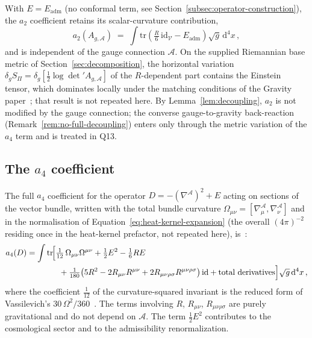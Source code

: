 \documentclass[12pt,a4paper]{article}
\theoremstyle{remark}
\theoremstyle{plain}
\theoremstyle{definition}
\begin{document}
      With $E = E_{\mathrm{adm}}$ (no conformal term, see
      Section~\ref{subsec:operator-construction}), the $a_2$
      coefficient retains its scalar-curvature contribution,
      \begin{equation}\label{eq:a2-minimal}
        a_2(A_{g,\mathcal{A}})
        \;=\;
        \int \mathrm{tr}\!\left(
          \tfrac{R}{6}\,\mathrm{id}_\mathcal{V}
          - E_{\mathrm{adm}}
        \right)\sqrt{g}\,\mathrm{d}^4 x\,,
      \end{equation}
      and is independent of the gauge connection $\mathcal{A}$.
      On the supplied Riemannian base metric of Section~\ref{sec:decomposition}, the horizontal variation
      $\delta_{g} S_\Pi = \delta_g[\tfrac{1}{2}\log\det'
      A_{g,\mathcal{A}}]$ of the $R$-dependent part contains the
      Einstein tensor, which dominates locally under the matching conditions of the Gravity
      paper~\cite{Beau2026h}; that result is not
      repeated here.
      By Lemma~\ref{lem:decoupling}, $a_2$ is not modified by the
      gauge connection; the converse gauge-to-gravity back-reaction
      (Remark~\ref{rem:no-full-decoupling}) enters only through the
      metric variation of the $a_4$ term and is treated in Q13.

    \subsection{The \texorpdfstring{$a_4$}{a4} coefficient}
      \label{subsec:a4-full}

      The full $a_4$ coefficient for the operator
      $D = -(\nabla^\mathcal{A})^2 + E$ acting on sections of the
      vector bundle, written with the total bundle curvature
      $\Omega_{\mu\nu} = [\nabla^\mathcal{A}_\mu,
      \nabla^\mathcal{A}_\nu]$ and in the normalisation of
      Equation~\eqref{eq:heat-kernel-expansion} (the overall
      $(4\pi)^{-2}$ residing once in the heat-kernel prefactor,
      not repeated here), is~\cite{Vassilevich2003}:
      \begin{align}\label{eq:a4-full}
        a_4(D)
        &=
        \int \mathrm{tr}\!\Bigl[
          \tfrac{1}{12}\,
          \Omega_{\mu\nu}\Omega^{\mu\nu}
          + \tfrac{1}{2} E^2
          - \tfrac{1}{6} R E
          \notag\\
        &\qquad\qquad
          + \tfrac{1}{180}\bigl(
          5 R^2
          - 2 R_{\mu\nu}R^{\mu\nu}
          + 2 R_{\mu\nu\rho\sigma}R^{\mu\nu\rho\sigma}
          \bigr)\,\mathrm{id}
          + \text{total derivatives}
          \Bigr]
        \sqrt{g}\,\mathrm{d}^4 x\,,
      \end{align}
      where the coefficient $\tfrac{1}{12}$ of the curvature-squared
      invariant is the reduced form of Vassilevich's
      $30\,\Omega^2/360$~\cite{Vassilevich2003}.
      The terms involving $R$, $R_{\mu\nu}$,
      $R_{\mu\nu\rho\sigma}$ are purely gravitational and
      do not depend on $\mathcal{A}$.
      The term $\tfrac{1}{2}E^2$ contributes to the cosmological
      sector and to the admissibility renormalization.
\end{document}
